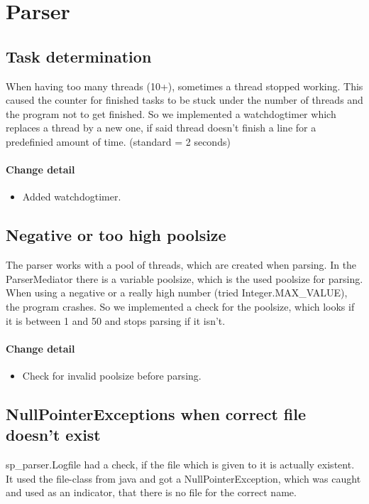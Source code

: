 \section{Parser}

\subsection{Task determination} 
When having too many threads (10+), sometimes a thread stopped working. This caused the counter for finished tasks
to be stuck under the number of threads and the program not to get finished.
So we implemented a watchdogtimer which replaces a thread by a new one, if said thread doesn't finish a line for a 
predefinied amount of time. (standard = 2 seconds)


\paragraph{Change detail}
\begin{itemize}
  \item Added watchdogtimer.
\end{itemize}

\subsection{Negative or too high poolsize}
The parser works with a pool of threads, which are created when parsing. In the ParserMediator there is
a variable poolsize, which is the used poolsize for parsing.
When using a negative or a really high number (tried Integer.MAX\_VALUE), the program crashes. 
So we implemented a check for the poolsize, which looks if it is between 1 and 50 and stops parsing if it isn't.


\paragraph{Change detail}
\begin{itemize}
  \item Check for invalid poolsize before parsing.
\end{itemize}

\subsection{NullPointerExceptions when correct file doesn't exist}
sp\_parser.Logfile had a check, if the file which is given to it is actually existent. It used the file-class from java
and got a NullPointerException, which was caught and used as an indicator, that there is no file for the correct name.

